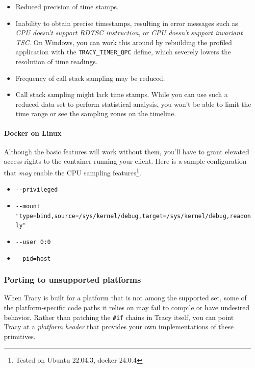\documentclass[hidelinks,titlepage,a4paper,twoside]{article}
\begin{document}
\begin{itemize}
\item Reduced precision of time stamps.
\item Inability to obtain precise timestamps, resulting in error messages such as \emph{CPU doesn't support RDTSC instruction}, or \emph{CPU doesn't support invariant TSC}. On Windows, you can work this around by rebuilding the profiled application with the \texttt{TRACY\_TIMER\_QPC} define, which severely lowers the resolution of time readings.
\item Frequency of call stack sampling may be reduced.
\item Call stack sampling might lack time stamps. While you can use such a reduced data set to perform statistical analysis, you won't be able to limit the time range or see the sampling zones on the timeline.
\end{itemize}

\paragraph{Docker on Linux}

Although the basic features will work without them, you'll have to grant elevated access rights to the container running your client. Here is a sample configuration that \textit{may} enable the CPU sampling features\footnote{Tested on Ubuntu 22.04.3, docker 24.0.4}.
\begin{itemize}
    \item \texttt{-{}-privileged}
    \item \texttt{-{}-mount "type=bind,source=/sys/kernel/debug,target=/sys/kernel/debug,readonly"}
    \item \texttt{-{}-user 0:0}
    \item \texttt{-{}-pid=host}
\end{itemize}

\subsubsection{Porting to unsupported platforms}
\label{customplatform}

When Tracy is built for a platform that is not among the supported set, some of the platform-specific code paths it relies on may fail to compile or have undesired behavior. Rather than patching the \texttt{\#if} chains in Tracy itself, you can point Tracy at a \emph{platform header} that provides your own implementations of these primitives.
\end{document}
